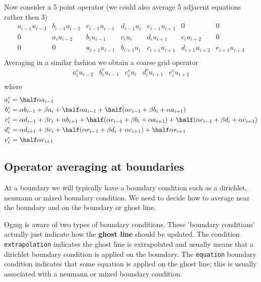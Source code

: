 \documentclass{article}
\begin{document}
Now consider a 5 point operator (we could also average 5 adjacent equations rather then 3)
\[
   \begin{matrix}
a_{i-1}u_{i-3}& b_{i-1}u_{i-2}& c_{i-1} u_{i-1}& d_{i-1} u_{i} & e_{i-1} u_{i+1} &  0              & 0 \\
    0         & a_i u_{i-2}   & b_i u_{i-1}    & c_i u_{i  }   & d_{i  } u_{i+1} & e_{i  } u_{i+2} & 0\\
    0         &       0       & a_{i+1} u_{i-1}& b_{i+1}u_{i}  & c_{i+1}u_{i+1}  & d_{i+1} u_{i+2} & e_{i+1} u_{i+3} \\
    \end{matrix}
\]
Averaging in a similar fashion we obtain a coarse grid operator
\[
   \begin{matrix}
    a_i^c u_{i-2}   & b_i^c u_{i-1}    & c_i^c u_{i}  & d_{i}^c u_{i+1} & e_{i}^c u_{i+2} \\
    \end{matrix}
\]
where
\begin{align*}
   a_i^c &= \half\alpha a_{i-1} \\  
   b_i^c &=  \alpha b_{i-1} + \beta a_i + \half \alpha a_{i-1}+
                \half( \alpha c_{i-1} + \beta b_i + \alpha a_{i+1} )      \\
   c_i^c &= \alpha d_{i-1} + \beta c_i +\alpha b_{i+1} +
               \half( \alpha c_{i-1} + \beta b_i + \alpha a_{i+1} ) +
               \half( \alpha e_{i-1} + \beta d_i + \alpha c_{i+1} ) \\
   d_i^c &=  \alpha d_{i+1} + \beta e_i +
              \half( \alpha e_{i-1} + \beta d_i + \alpha c_{i+1} ) +
               \half\alpha e_{i+1} \\
   e_i^c &= \half\alpha e_{i+1} \\  
\end{align*}


\subsection{Operator averaging at boundaries}

   At a boundary we will typically have a boundary condition such as a dirichlet, neumann or mixed boundary
condition. We need to decide how to average near the boundary and on the boundary or ghost line.

Ogmg is aware of two types of boundary conditions. These 'boundary conditions' actually
just indicate how the {\bf ghost line} should be updated. The condition {\tt extrapolation} indicates the 
ghost line is extrapolated and usually means that a dirichlet boundary condition is applied on
the boundary. The {\tt equation} boundary condition indicates that some equation is applied on
the ghost line; this is usually associated with a neumann or mixed boundary condition.
\end{document}
